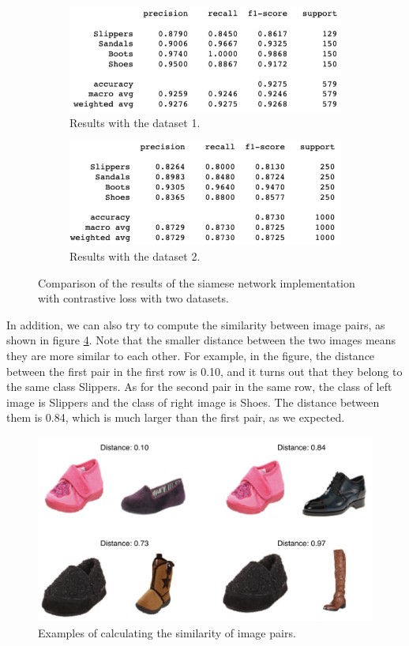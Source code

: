  \begin{figure}[h]
  \centering
  \begin{subfigure}[b]{\linewidth}
  \includegraphics[width=\linewidth]{figs/sia_con_data1.png}
  \caption{Results with the dataset 1.}
  \label{fig:sia_con_data1}
  \end{subfigure}
  \hfill
   \begin{subfigure}[b]{\linewidth}
   \includegraphics[width=\linewidth]{figs/sia_con_data2.png}
   \caption{Results with the dataset 2.}
   \label{fig:sia_con_data2}
  \end{subfigure}
    \hfill
    \caption{Comparison of the results of the siamese network implementation with contrastive loss with two datasets.}
    \label{fig:sia_con_data}
\end{figure}

In addition, we can also try to compute the similarity between image pairs, as shown in figure \ref{fig:similarity}. Note that the smaller distance between the two images means they are more similar to each other. For example, in the figure, the distance between the first pair in the first row is 0.10, and it turns out that they belong to the same class Slippers. As for the second pair in the same row, the class of left image is Slippers and the class of right image is Shoes. The distance between them is 0.84, which is much larger than the first pair, as we expected. 

\begin{figure}[h]
  \centering
  \includegraphics[width=\linewidth]{figs/similarity.png}
  \caption{Examples of calculating the similarity of image pairs.}
  \label{fig:similarity}
\end{figure}


